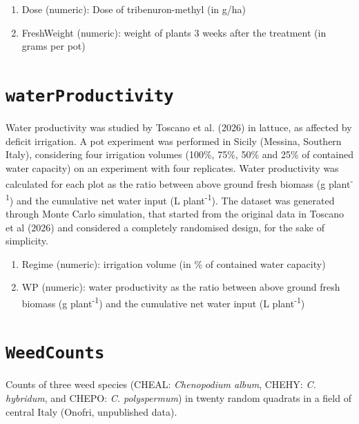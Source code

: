 \documentclass[
  letterpaper,
  DIV=11,
  numbers=noendperiod]{scrreprt}
\providecommand{\tightlist}{%
  \setlength{\itemsep}{0pt}\setlength{\parskip}{0pt}}
\begin{document}
\begin{enumerate}
\def\labelenumi{\arabic{enumi}.}
\tightlist
\item
  Dose (numeric): Dose of tribenuron-methyl (in g/ha)
\item
  FreshWeight (numeric): weight of plants 3 weeks after the treatment
  (in grams per pot)
\end{enumerate}

\section*{\texorpdfstring{\texttt{waterProductivity}}{waterProductivity}}\label{waterProductivity}


Water productivity was studied by Toscano et al. (2026) in lattuce, as
affected by deficit irrigation. A pot experiment was performed in Sicily
(Messina, Southern Italy), considering four irrigation volumes (100\%,
75\%, 50\% and 25\% of contained water capacity) on an experiment with
four replicates. Water productivity was calculated for each plot as the
ratio between above ground fresh biomass (g plant\textsuperscript{-1})
and the cumulative net water input (L plant\textsuperscript{-1}). The
dataset was generated through Monte Carlo simulation, that started from
the original data in Toscano et al (2026) and considered a completely
randomised design, for the sake of simplicity.

\begin{enumerate}
\def\labelenumi{\arabic{enumi}.}
\tightlist
\item
  Regime (numeric): irrigation volume (in \% of contained water
  capacity)
\item
  WP (numeric): water productivity as the ratio between above ground
  fresh biomass (g plant\textsuperscript{-1}) and the cumulative net
  water input (L plant\textsuperscript{-1})
\end{enumerate}

\section*{\texorpdfstring{\texttt{WeedCounts}}{WeedCounts}}\label{weedcounts}


Counts of three weed species (CHEAL: \emph{Chenopodium album}, CHEHY:
\emph{C. hybridum}, and CHEPO: \emph{C. polyspermum}) in twenty random
quadrats in a field of central Italy (Onofri, unpublished data).
\end{document}
